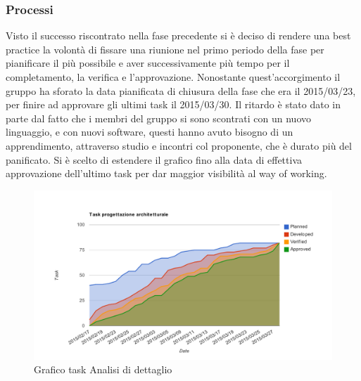 		\subsubsection{Processi}
		Visto il successo riscontrato nella fase precedente si è deciso di rendere una best practice la volontà di fissare una riunione nel primo periodo della fase per pianificare il più possibile e aver successivamente più tempo per il completamento, la verifica e l'approvazione. Nonostante quest'accorgimento il gruppo ha sforato la data pianificata di chiusura della fase che era il 2015/03/23, per finire ad approvare gli ultimi task il 2015/03/30. Il ritardo è stato dato in parte dal fatto che i membri del gruppo si sono scontrati con un nuovo linguaggio, e con nuovi software, questi hanno avuto bisogno di un apprendimento, attraverso studio e incontri col proponente, che è durato più del panificato. Si è scelto di estendere il grafico fino alla data di effettiva approvazione dell'ultimo task per dar maggior visibilità al way of working.
		\begin{figure}[htbp]
				\centering
				\centerline{\includegraphics[scale=1]{images/Grafico_fase_4.pdf}}
				\caption{Grafico task Analisi di dettaglio}
				\label{fig:taskfase4}
			\end{figure}
